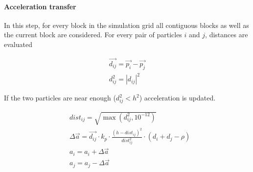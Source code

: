 \paragraph{Acceleration transfer}
In this step, for every block in the simulation grid all contiguous blocks as
well as the current block are considered. For every pair of particles $i$ and
$j$, distances are evaluated

\[
\begin{split}
\vec{d_{ij}} = \vec{p_i} - \vec{p_j} \\
d_{ij}^2 = | d_{ij} |^2
\end{split}
\]

If the two particles are near enough ($d_{ij}^2 < h^2$) acceleration is updated.

\[
\begin{split}
& dist_{ij} = \sqrt{\max(d_{ij}^2, 10^{-12})} \\
& \Delta \vec{a} = \vec{d_{ij}} \cdot k_p \cdot \frac{(h - dist_{ij})^2}{dist_{ij}^2} \cdot
(d_i + d_j - \rho) \\
&a_i = a_i + \Delta \vec{a}\\
&a_j = a_j - \Delta \vec{a}
\end{split}
\]
